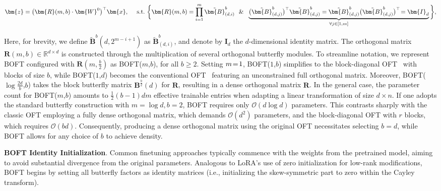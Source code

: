 \begin{equation}
    \begin{aligned}\nonumber
    \bm{z}=\big(\bm{R}(m,b)\cdot\bm{W}^0\big)^\top\bm{x},~~~~\text{s.t.}~\bigg{\{}\bm{R}(m,b)=\prod_{i=1}^m \tilde{\bm{B}}^b_{(d,i)}~~\&~~\underbrace{\big(\tilde{\bm{B}}^b_{(d,j)}\big)^\top\tilde{\bm{B}}^b_{(d,j)}=\tilde{\bm{B}}^b_{(d,j)}\big(\tilde{\bm{B}}^b_{(d,j)}\big)^\top\!=\bm{I}_d}_{\forall j\in [1, m]}\bigg{\}},
    \end{aligned}
\end{equation}

Here, for brevity, we define $\tilde{\bm{B}}^b(d,2^{m - i+1})$ as $\tilde{\bm{B}}^b_{(d,i)}$, and denote by $\bm{I}_d$ the $d$-dimensional identity matrix. The orthogonal matrix $\bm{R}(m,b)\in\mathbb{R}^{d\times d}$ is constructed through the multiplication of several orthogonal butterfly modules. To streamline notation, we represent BOFT configured with $\bm{R}(m,\frac{b}{2})$ as BOFT($m$,$b$), for all $b\geq 2$. Setting $\thickmuskip=2mu \medmuskip=2mu m=1$, BOFT($1$,$b$) simplifies to the block-diagonal OFT~\cite{qiu2023controlling} with blocks of size $b$, while BOFT($1$,$d$) becomes the conventional OFT~\cite{qiu2023controlling} featuring an unconstrained full orthogonal matrix. Moreover, BOFT($\log \frac{2d}{b}$,$b$) takes the block butterfly matrix $\bm{B}^{\frac{b}{2}}(d)$ for $\bm{R}$, resulting in a dense orthogonal matrix $\bm{R}$. In the general case, the parameter count for BOFT($m$,$b$) amounts to $\frac{1}{2}(b-1)dm$ effective trainable entries when adapting a linear transformation of size $d\times n$. If one adopts the standard butterfly construction with $m=\log d, b=2$, BOFT requires only $\mathcal{O}(d\log d)$ parameters. This contrasts sharply with the classic OFT employing a fully dense orthogonal matrix, which demands $\mathcal{O}(d^2)$ parameters, and the block-diagonal OFT with $r$ blocks, which requires $\mathcal{O}(bd)$. Consequently, producing a dense orthogonal matrix using the original OFT necessitates selecting $b=d$, while BOFT allows for any choice of $b$ to achieve density.

\textbf{BOFT Identity Initialization}. Common finetuning approaches typically commence with the weights from the pretrained model, aiming to avoid substantial divergence from the original parameters. Analogous to LoRA's use of zero initialization for low-rank modifications, BOFT begins by setting all butterfly factors as identity matrices (i.e., initializing the skew-symmetric part to zero within the Cayley transform).

